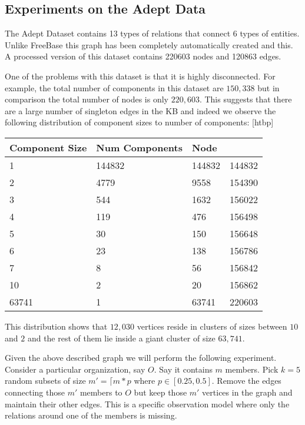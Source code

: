 \documentclass{tufte-handout}
\makeatletter
\renewenvironment{table}[1][htbp]{%
\@tufte@orig@float{table}[#1]}{%
\@tufte@orig@endfloat}%
\makeatother
\begin{document}
\subsection{Experiments on the Adept Data}
\label{sec:exper-adept-data}
The Adept Dataset contains 13 types of relations that connect 6 types of
entities. Unlike FreeBase this graph has been completely automatically
created and this. A processed version of this dataset contains 220603 nodes
and 120863 edges.

One of the problems with this dataset is that it is highly disconnected.
For example, the total number of components in this dataset are $150,338$
but in comparison the total number of nodes is only $220,603$. This suggests
that there are a large number of singleton edges in the KB and indeed we observe the following distribution of component sizes to number of components:
\begin{table}[htbp]
  \centering
  \begin{tabular}{l l l l}
\textbf{Component Size} & \textbf{Num Components} & \textbf{Node} & \\\toprule
1                       & 144832       &  144832 & 144832         \\
2                       & 4779         &  9558   & 154390         \\
3                       & 544          &  1632   & 156022         \\
4                       & 119          &  476    & 156498         \\
5                       & 30           &  150    & 156648         \\
6                       & 23           &  138    & 156786         \\
7                       & 8            &  56     & 156842         \\
10                      & 2            &  20     & 156862         \\
63741                   & 1            &  63741  & 220603 \\\bottomrule
  \end{tabular}
  \caption{Histogram of component sizes to number of components.}
\label{tab:hist-comp-size}
\end{table}
This distribution shows that $12,030$ vertices reside in clusters of sizes between
$10$ and $2$ and the rest of them lie inside a giant cluster of size $63,741$.

 Given the above described graph we will
perform the following experiment.
Consider a particular organization, say $O$. Say it contains $m$ members.
Pick $k = 5$ random subsets of size $m' = \lceil{m * p}$ where
$p \in [0.25, 0.5]$. Remove the edges connecting those $m'$ members to
$O$ but keep those $m'$ vertices in the graph and maintain their other edges.
This is a specific observation model where only the relations around one of
the members is missing.
\end{document}
